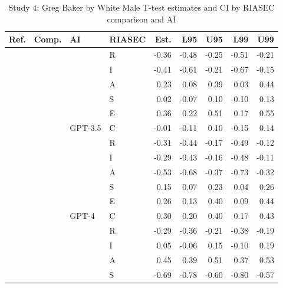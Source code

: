 \begin{table}

\caption{Study 4: Greg Baker by White Male T-test estimates and CI by RIASEC comparison and AI}
\centering
\fontsize{8}{10}\selectfont
\begin{tabular}[t]{llllrrrrr}
\toprule
Ref. & Comp. & AI & RIASEC & Est. & L95 & U95 & L99 & U99\\
\midrule
 &  &  & R & -0.36 & -0.48 & -0.25 & -0.51 & -0.21\\

 &  &  & I & -0.41 & -0.61 & -0.21 & -0.67 & -0.15\\

 &  &  & A & 0.23 & 0.08 & 0.39 & 0.03 & 0.44\\

 &  &  & S & 0.02 & -0.07 & 0.10 & -0.10 & 0.13\\

 &  &  & E & 0.36 & 0.22 & 0.51 & 0.17 & 0.55\\

 &  & \multirow[t]{-6}{*}{\raggedright\arraybackslash GPT-3.5} & C & -0.01 & -0.11 & 0.10 & -0.15 & 0.14\\

 &  &  & R & -0.31 & -0.44 & -0.17 & -0.49 & -0.12\\

 &  &  & I & -0.29 & -0.43 & -0.16 & -0.48 & -0.11\\

 &  &  & A & -0.53 & -0.68 & -0.37 & -0.73 & -0.32\\

 &  &  & S & 0.15 & 0.07 & 0.23 & 0.04 & 0.26\\

 &  &  & E & 0.26 & 0.13 & 0.40 & 0.09 & 0.44\\

 &  & \multirow[t]{-6}{*}{\raggedright\arraybackslash GPT-4} & C & 0.30 & 0.20 & 0.40 & 0.17 & 0.43\\

 &  &  & R & -0.29 & -0.36 & -0.21 & -0.38 & -0.19\\

 &  &  & I & 0.05 & -0.06 & 0.15 & -0.10 & 0.19\\

 &  &  & A & 0.45 & 0.39 & 0.51 & 0.37 & 0.53\\

 &  &  & S & -0.69 & -0.78 & -0.60 & -0.80 & -0.57\\


\end{tabular}
\end{table}
